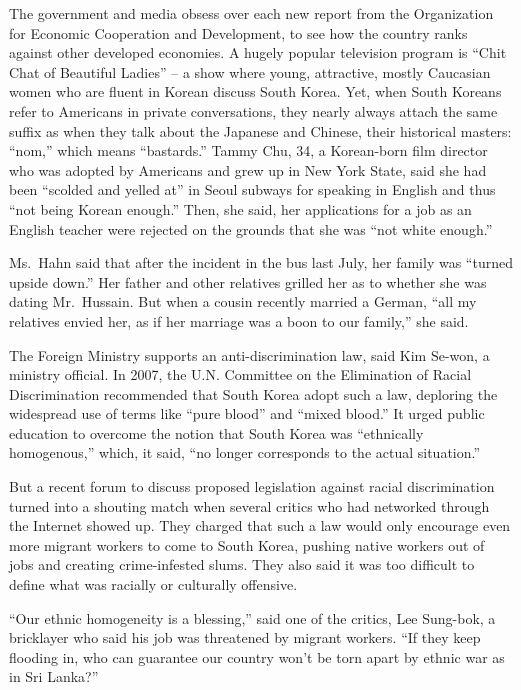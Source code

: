 ﻿\documentclass[12pt]{article}
\begin{document}
The government and media obsess over each new report from the Organization for Economic Cooperation
and Development, to see how the country ranks against other developed economies. A hugely popular
television program is ``Chit Chat of Beautiful Ladies'' -- a show where young, attractive, mostly
Caucasian women who are fluent in Korean discuss South Korea. Yet, when South Koreans refer to
Americans in private conversations, they nearly always attach the same suffix as when they talk
about the Japanese and Chinese, their historical masters: ``nom,'' which means ``bastards.'' Tammy
Chu, 34, a Korean-born film director who was adopted by Americans and grew up in New York State,
said she had been ``scolded and yelled at'' in Seoul subways for speaking in English and thus ``not
being Korean enough.'' Then, she said, her applications for a job as an English teacher were
rejected on the grounds that she was ``not white enough.''

Ms.~Hahn said that after the incident in the bus last July, her family was ``turned upside down.''
Her father and other relatives grilled her as to whether she was dating Mr.~Hussain. But when a
cousin recently married a German, ``all my relatives envied her, as if her marriage was a boon to
our family,'' she said.

The Foreign Ministry supports an anti-discrimination law, said Kim Se-won, a ministry official. In
2007, the U.N. Committee on the Elimination of Racial Discrimination recommended that South Korea
adopt such a law, deploring the widespread use of terms like ``pure blood'' and ``mixed blood.'' It
urged public education to overcome the notion that South Korea was ``ethnically homogenous,'' which,
it said, ``no longer corresponds to the actual situation.''

But a recent forum to discuss proposed legislation against racial discrimination turned into a
shouting match when several critics who had networked through the Internet showed up. They charged
that such a law would only encourage even more migrant workers to come to South Korea, pushing
native workers out of jobs and creating crime-infested slums. They also said it was too difficult to
define what was racially or culturally offensive.

``Our ethnic homogeneity is a blessing,'' said one of the critics, Lee Sung-bok, a bricklayer who
said his job was threatened by migrant workers. ``If they keep flooding in, who can guarantee our
country won't be torn apart by ethnic war as in Sri Lanka?''
\end{document}
